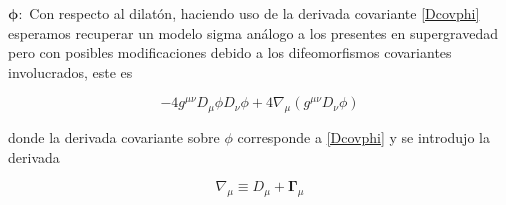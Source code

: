 \documentclass{article}
\numberwithin{equation}{section}
\begin{document}

$ \pmb{\phi:} $ Con respecto al dilatón, haciendo uso de la derivada covariante \ref{Dcovphi} esperamos recuperar un modelo sigma análogo a los presentes en supergravedad pero con posibles modificaciones debido a los difeomorfismos covariantes involucrados, este es

\begin{equation}\label{DphiDphi}
-4g^{\mu \nu} D_{\mu} \phi D_{\nu} \phi + 4 \nabla_{\mu} \left(g^{\mu \nu} D_{\nu} \phi\right)
\end{equation}

donde la derivada covariante sobre $ \phi $ corresponde a \ref{Dcovphi} y se introdujo la derivada

\begin{equation}
\nabla_{\mu} \equiv D_{\mu} + \pmb{\Gamma}_{\mu}
\end{equation}
\end{document}
